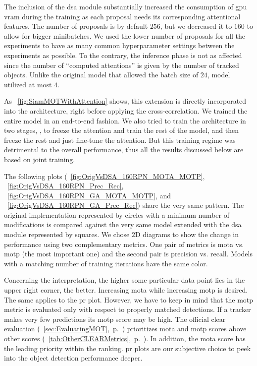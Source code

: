 The inclusion of the \gls{dsa} module substantially increased the consumption of \gls{gpu} \gls{vram} during the training as each proposal needs its corresponding attentional features. The number of proposals is by default $256$, but we decreased it to $160$ to allow for bigger minibatches. We used the lower number of proposals for all the experiments to have as many common hyperparameter settings between the experiments as possible. To the contrary, the inference phase is not as affected since the number of ``computed attentions'' is given by the number of tracked objects. Unlike the original model that allowed the batch size of $24$, \dsamodel{} model utilized at most $4$.

As \figtext{}~\ref{fig:SiamMOTWithAttention} shows, this extension is directly incorporated into the architecture, right before applying the cross-correlation. We trained the entire model in an end-to-end fashion. We also tried to train the architecture in two stages, \ietext{}, to freeze the attention and train the rest of the model, and then freeze the rest and just fine-tune the attention. But this training regime was detrimental to the overall performance, thus all the results discussed below are based on joint training.

The following plots (\figtext{}~\ref{fig:OrigVsDSA_160RPN_MOTA_MOTP}, \figtext{}~\ref{fig:OrigVsDSA_160RPN_Prec_Rec}, \figtext{}~\ref{fig:OrigVsDSA_160RPN_GA_MOTA_MOTP}, and \figtext{}~\ref{fig:OrigVsDSA_160RPN_GA_Prec_Rec}) share the very same pattern. The original implementation represented by circles with a minimum number of modifications is compared against the very same model extended with the \gls{dsa} module represented by squares. We chose $2$D diagrams to show the change in performance using two complementary metrics. One pair of metrics is \gls{mota} vs. \gls{motp} (the most important one) and the second pair is precision vs. recall. Models with a matching number of training iterations have the same color.

Concerning the interpretation, the higher some particular data point lies in the upper right corner, the better. Increasing \gls{mota} while increasing \gls{motp} is desired. The same applies to the \gls{pr} plot. However, we have to keep in mind that the \gls{motp} metric is evaluated only with respect to properly matched detections. If a tracker makes very few predictions its \gls{motp} score may be high. The official \gls{clear} evaluation (\sectiontext{}~\ref{sec:EvaluatingMOT},~p.~\pageref{sec:EvaluatingMOT}) prioritizes \gls{mota} and \gls{motp} scores above other scores (\tabletext{}~\ref{tab:OtherCLEARMetrics},~p.~\pageref{tab:OtherCLEARMetrics}). In addition, the \gls{mota} score has the leading priority within the ranking. \gls{pr} plots are our subjective choice to peek into the object detection performance deeper.

